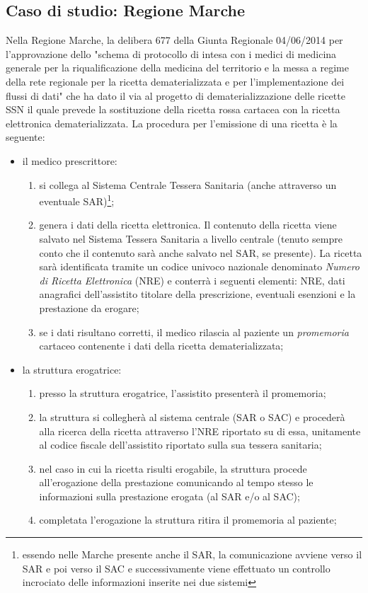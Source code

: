\subsection{Caso di studio: Regione Marche}
%
Nella Regione Marche, la delibera 677\cite{drmarche} della Giunta Regionale 04/06/2014 per l'approvazione dello "schema di protocollo di intesa con i medici di medicina generale per la riqualificazione della medicina del territorio e la messa a regime della rete regionale per la ricetta dematerializzata e per l'implementazione dei flussi di dati" che ha dato il via al progetto di dematerializzazione delle ricette SSN il quale prevede la sostituzione della ricetta rossa cartacea con la ricetta elettronica dematerializzata. La procedura per l'emissione di una ricetta è la seguente:
\begin{itemize}
	\item il medico prescrittore:
	      \begin{enumerate}
	      	\item si collega al Sistema Centrale Tessera Sanitaria (anche attraverso un eventuale SAR)\footnote{essendo nelle Marche presente anche il SAR, la comunicazione avviene verso il SAR e poi verso il SAC e successivamente viene effettuato un controllo incrociato delle informazioni inserite nei due sistemi};
	      	\item genera i dati della ricetta elettronica. Il contenuto della ricetta viene salvato nel Sistema Tessera Sanitaria a livello centrale (tenuto sempre conto che il contenuto sarà anche salvato nel SAR, se presente). La ricetta sarà identificata tramite un codice univoco nazionale denominato \emph{Numero di Ricetta Elettronica} (NRE) e conterrà i seguenti elementi: NRE, dati anagrafici dell'assistito titolare della prescrizione, eventuali esenzioni e la prestazione da erogare;
	      	\item se i dati risultano corretti, il medico rilascia al paziente un \emph{promemoria} cartaceo contenente i dati della ricetta dematerializzata;
	      \end{enumerate} 
	\item la struttura erogatrice:
	      \begin{enumerate}
	      	\item presso la struttura erogatrice, l'assistito presenterà il promemoria;
	      	\item la struttura si collegherà al sistema centrale (SAR o SAC) e procederà alla ricerca della ricetta attraverso l'NRE riportato su di essa, unitamente al codice fiscale dell'assistito riportato sulla sua tessera sanitaria;
	      	\item nel caso in cui la ricetta risulti erogabile, la struttura procede all'erogazione della prestazione comunicando al tempo stesso le informazioni sulla prestazione erogata (al SAR e/o al SAC);
	      	\item completata l'erogazione la struttura ritira il promemoria al paziente;
	      \end{enumerate}
\end{itemize}
